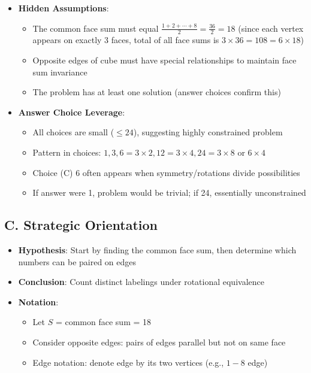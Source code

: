 \documentclass[]{article}
\begin{document}
\begin{problemconfigbox}
\begin{itemize}[leftmargin=*]
    \item \textbf{Hidden Assumptions}:
    \begin{itemize}
        \item The common face sum must equal $\frac{1+2+\cdots+8}{2} = \frac{36}{2} = 18$ (since each vertex appears on exactly 3 faces, total of all face sums is $3 \times 36 = 108 = 6 \times 18$)
        \item Opposite edges of cube must have special relationships to maintain face sum invariance
        \item The problem has at least one solution (answer choices confirm this)
    \end{itemize}
    
    \item \textbf{Answer Choice Leverage}:
    \begin{itemize}
        \item All choices are small ($\leq 24$), suggesting highly constrained problem
        \item Pattern in choices: $1, 3, 6=3\times2, 12=3\times4, 24=3\times8$ or $6\times4$
        \item Choice (C) 6 often appears when symmetry/rotations divide possibilities
        \item If answer were 1, problem would be trivial; if 24, essentially unconstrained
    \end{itemize}
\end{itemize}

\subsection*{C. Strategic Orientation}
\begin{itemize}[leftmargin=*]
    \item \textbf{Hypothesis}: Start by finding the common face sum, then determine which numbers can be paired on edges
    
    \item \textbf{Conclusion}: Count distinct labelings under rotational equivalence
    
    \item \textbf{Notation}:
    \begin{itemize}
        \item Let $S$ = common face sum = 18
        \item Consider opposite edges: pairs of edges parallel but not on same face
        \item Edge notation: denote edge by its two vertices (e.g., $1-8$ edge)
    \end{itemize}
    

\end{itemize}
\end{problemconfigbox}
\end{document}
